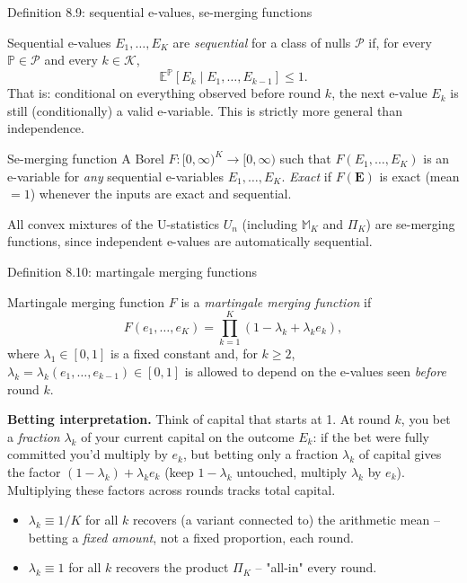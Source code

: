 \documentclass[aspectratio=169,10pt]{beamer}
\newcommand{\E}{\mathbb{E}}
\newcommand{\Pb}{\mathbb{P}}
\newcommand{\calK}{\mathcal{K}}
\newcommand{\calP}{\mathcal{P}}
\begin{document}
\begin{frame}{Definition 8.9: sequential e-values, se-merging functions}
  \begin{block}{Sequential e-values}
    $E_1,\dots,E_K$ are \emph{sequential} for a class of nulls $\calP$ if, for every $\Pb \in \calP$ and every $k \in \calK$,
    \[
      \E^{\Pb}[E_k \mid E_1,\dots,E_{k-1}] \leq 1.
    \]
    That is: conditional on everything observed before round $k$, the next e-value $E_k$ is still (conditionally) a valid e-variable. This is strictly more general than independence.
  \end{block}
  \begin{block}{Se-merging function}
    A Borel $F:[0,\infty)^K \to [0,\infty)$ such that $F(E_1,\dots,E_K)$ is an e-variable for \emph{any} sequential e-variables $E_1,\dots,E_K$. \emph{Exact} if $F(\mathbf E)$ is exact (mean $=1$) whenever the inputs are exact and sequential.
  \end{block}
  All convex mixtures of the U-statistics $U_n$ (including $\mathbb{M}_K$ and $\Pi_K$) are se-merging functions, since independent e-values are automatically sequential.
\end{frame}

\begin{frame}{Definition 8.10: martingale merging functions}
  \begin{block}{Martingale merging function}
    $F$ is a \emph{martingale merging function} if
    \[
      F(e_1,\dots,e_K) = \prod_{k=1}^K \left(1 - \lambda_k + \lambda_k e_k\right),
    \]
    where $\lambda_1 \in [0,1]$ is a fixed constant and, for $k \geq 2$, $\lambda_k = \lambda_k(e_1,\dots,e_{k-1}) \in [0,1]$ is allowed to depend on the e-values seen \emph{before} round $k$.
  \end{block}
  \textbf{Betting interpretation.} Think of capital that starts at 1. At round $k$, you bet a \emph{fraction} $\lambda_k$ of your current capital on the outcome $E_k$: if the bet were fully committed you'd multiply by $e_k$, but betting only a fraction $\lambda_k$ of capital gives the factor $(1-\lambda_k) + \lambda_k e_k$ (keep $1-\lambda_k$ untouched, multiply $\lambda_k$ by $e_k$). Multiplying these factors across rounds tracks total capital.
  \begin{itemize}
    \item $\lambda_k \equiv 1/K$ for all $k$ recovers (a variant connected to) the arithmetic mean -- betting a \emph{fixed amount}, not a fixed proportion, each round.
    \item $\lambda_k \equiv 1$ for all $k$ recovers the product $\Pi_K$ -- "all-in" every round.
  \end{itemize}
\end{frame}
\end{document}
